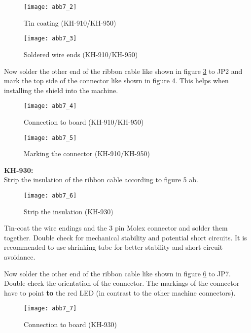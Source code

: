 \documentclass[fleqn,10pt]{SelfArx} %
\begin{document}
\begin{figure}[tbhp]\centering
\texttt{[image: abb7\_2]}
\caption{Tin coating (KH-910/KH-950)}
\label{fig:abb7_2}
\end{figure}

\begin{figure}[tbhp]\centering
\texttt{[image: abb7\_3]}
\caption{Soldered wire ends (KH-910/KH-950)}
\label{fig:abb7_3}
\end{figure}

Now solder the other end of the ribbon cable like shown in figure \ref{fig:abb7_4} to JP2 and mark the top side of the connector like shown in figure \ref{fig:abb7_5}. This helps when installing the shield into the machine.\par

\begin{figure}[tbhp]\centering
\texttt{[image: abb7\_4]}
\caption{Connection to board (KH-910/KH-950)}
\label{fig:abb7_4}
\end{figure}

\begin{figure}[tbhp]\centering
\texttt{[image: abb7\_5]}
\caption{Marking the connector (KH-910/KH-950)}
\label{fig:abb7_5}
\end{figure}

\FloatBarrier

\textbf{KH-930:} \\

Strip the insulation of the ribbon cable according to figure \ref{fig:abb7_6} ab.

\begin{figure}[tbhp]\centering
\texttt{[image: abb7\_6]}
\caption{Strip the insulation (KH-930)}
\label{fig:abb7_6}
\end{figure}

Tin-coat the wire endings and the 3 pin Molex connector and solder them together. Double check for mechanical stability and potential short circuits. It is recommended to use shrinking tube for better stability and short circuit avoidance.

Now solder the other end of the ribbon cable like shown in figure \ref{fig:abb7_7} to JP7. Double check the orientation of the connector. The markings of the connector have to point \textbf{to} the red LED (in contrast to the other machine connectors).

\begin{figure}[tbhp]\centering
\texttt{[image: abb7\_7]}
\caption{Connection to board (KH-930)}
\label{fig:abb7_7}
\end{figure}
\end{document}
